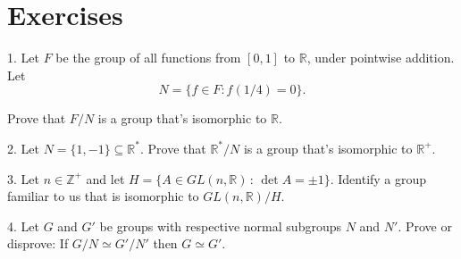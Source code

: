 \documentclass[10pt,]{book}
\theoremstyle{plain}
\theoremstyle{definition}
\theoremstyle{definition}
\theoremstyle{definition}
\theoremstyle{definition}
\numberwithin{equation}{section}
\def\Z{\mathbb{Z}}
\def\R{\mathbb{R}}
\begin{document}
\section[{Exercises}]{Exercises}\label{exercises-10}
\begin{exerciselist}
\item[1.]\hypertarget{exercise-63}{}Let \(F\) be the group of all functions from \([0,1]\) to \(\R\), under pointwise addition. Let%
\begin{equation*}
N=\{f\in F:
f(1/4)=0\}.
\end{equation*}
%
\par
Prove that \(F/N\) is a group that's isomorphic to \(\R\).%
\par\smallskip
\item[2.]\hypertarget{exercise-64}{}Let \(N=\{1,-1\}\subseteq \R^*\). Prove that \(\R^*/N\) is a group that's isomorphic to \(\R^+\).%
\par\smallskip
\item[3.]\hypertarget{exercise-65}{}Let \(n\in \Z^+\) and let \(H=\{A\in GL(n,\R)\,:\, \det A =\pm
1\}\). Identify a group familiar to us that is isomorphic to \(GL(n,\R)/H\).%
\par\smallskip
\item[4.]\hypertarget{exercise-66}{}Let \(G\) and \(G'\) be groups with respective normal subgroups \(N\) and \(N'\). Prove or disprove: If \(G/N\simeq G'/N'\) then \(G\simeq
G'\).%
\par\smallskip
\end{exerciselist}
%
%
%
\appendix
%
\typeout{************************************************}
\typeout{************************************************}
\end{document}

